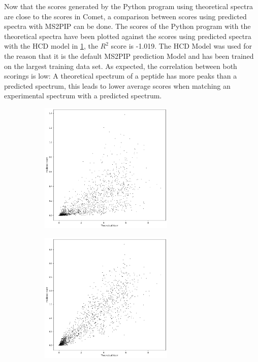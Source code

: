 \documentclass[11pt]{article}
\begin{document}
Now that the scores generated by the Python program using theoretical spectra are close to the scores in Comet, a comparison between scores using predicted spectra with MS2PIP can be done. The scores of the Python program with the theoretical spectra have been plotted against the scores using predicted spectra with the HCD model in \cref{fig:scatterplot_predicted_theoretical}, the \(R^2\) score is -1.019. The HCD Model was used for the reason that it is the default MS2PIP prediction Model and has been trained on the largest training data set. As expected, the correlation between both scorings is low: A theoretical spectrum of a peptide has more peaks than a predicted spectrum, this leads to lower average scores when matching an experimental spectrum with a predicted spectrum.

\begin{figure}
\centering
\begin{subfigure}[b]{1\textwidth}
    \includegraphics[width=0.7\textwidth]{figs/scatterplot_predicted_theoretical.png}
   \caption{}
   \label{fig:scatterplot_predicted_theoretical} 
\end{subfigure}
\begin{subfigure}[b]{1\textwidth}
   \includegraphics[width=0.7\textwidth]{figs/scatterplot_windows.png}

\end{subfigure}
\end{figure}
\end{document}
